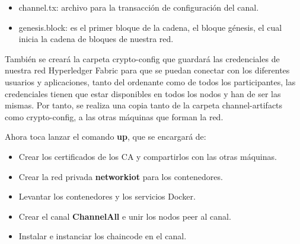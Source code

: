 \begin{itemize}
  \item channel.tx: archivo para la transacción de configuración del canal.
  \item genesis.block: es el primer bloque de la cadena, el bloque génesis, el cual inicia la cadena de bloques de 
  nuestra red.
\end{itemize}

\noindent También se creará la carpeta crypto-config que guardará las credenciales de nuestra red Hyperledger Fabric 
para que se puedan conectar con los diferentes usuarios y aplicaciones, tanto del ordenante como de todos los 
participantes, las credenciales tienen que estar disponibles en todos los nodos y han de ser las mismas. Por tanto, se 
realiza una copia tanto de la carpeta channel-artifacts como crypto-config, a las otras máquinas que forman la red.

\vspace{5mm}

\noindent Ahora toca lanzar el comando \textbf{up}, que se encargará de:

\begin{itemize}
  \item Crear los certificados de los CA y compartirlos con las otras máquinas.
  \item Crear la red privada \textbf{networkiot} para los contenedores.
  \item Levantar los contenedores y los servicios Docker.
  \item Crear el canal \textbf{ChannelAll} e unir los nodos peer al canal.
  \item Instalar e instanciar los chaincode en el canal.
\end{itemize}

